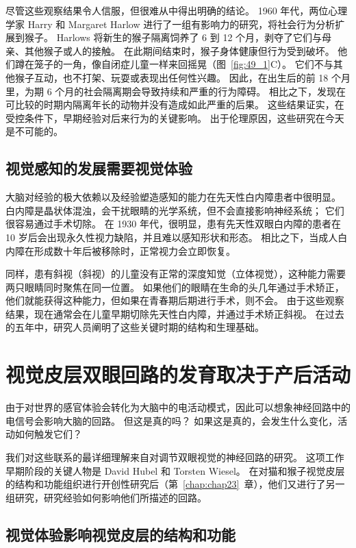 尽管这些观察结果令人信服，但很难从中得出明确的结论。
1960 年代，两位心理学家 Harry 和 Margaret Harlow 进行了一组有影响力的研究，将社会行为分析扩展到猴子。
Harlows 将新生的猴子隔离饲养了 6 到 12 个月，剥夺了它们与母亲、其他猴子或人的接触。
在此期间结束时，猴子身体健康但行为受到破坏。 他们蹲在笼子的一角，像自闭症儿童一样来回摇晃（图~\ref{fig:49_1}C）。
它们不与其他猴子互动，也不打架、玩耍或表现出任何性兴趣。
因此，在出生后的前 18 个月里，为期 6 个月的社会隔离期会导致持续和严重的行为障碍。
相比之下，发现在可比较的时期内隔离年长的动物并没有造成如此严重的后果。
这些结果证实，在受控条件下，早期经验对后来行为的关键影响。
出于伦理原因，这些研究在今天是不可能的。



\subsection{视觉感知的发展需要视觉体验}

大脑对经验的极大依赖以及经验塑造感知的能力在先天性白内障患者中很明显。
白内障是晶状体混浊，会干扰眼睛的光学系统，但不会直接影响神经系统；
它们很容易通过手术切除。
在 1930 年代，很明显，患有先天性双眼白内障的患者在 10 岁后会出现永久性视力缺陷，并且难以感知形状和形态。
相比之下，当成人白内障在形成数十年后被移除时，正常视力会立即恢复。


同样，患有斜视（斜视）的儿童没有正常的深度知觉（立体视觉），这种能力需要两只眼睛同时聚焦在同一位置。
如果他们的眼睛在生命的头几年通过手术矫正，他们就能获得这种能力，但如果在青春期后期进行手术，则不会。
由于这些观察结果，现在通常会在儿童早期切除先天性白内障，并通过手术矫正斜视。
在过去的五年中，研究人员阐明了这些关键时期的结构和生理基础。



\section{视觉皮层双眼回路的发育取决于产后活动}

由于对世界的感官体验会转化为大脑中的电活动模式，因此可以想象神经回路中的电信号会影响大脑的回路。
但这是真的吗？
如果这是真的，会发生什么变化，活动如何触发它们？


我们对这些联系的最详细理解来自对调节双眼视觉的神经回路的研究。
这项工作早期阶段的关键人物是 David Hubel 和 Torsten Wiesel。
在对猫和猴子视觉皮层的结构和功能组织进行开创性研究后（第~\ref{chap:chap23}~章），他们又进行了另一组研究，研究经验如何影响他们所描述的回路。



\subsection{视觉体验影响视觉皮层的结构和功能}

